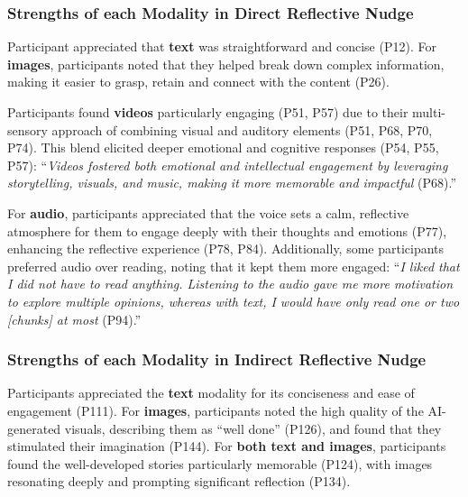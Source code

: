 \subsubsection{Strengths of each Modality in Direct Reflective Nudge}
Participant appreciated that \textbf{text} was straightforward and concise (P12). For \textbf{images}, participants noted that they helped break down complex information, making it easier to grasp, retain and connect with the content (P26).

Participants found \textbf{videos} particularly engaging (P51, P57) due to their multi-sensory approach of combining visual and auditory elements (P51, P68, P70, P74). This blend elicited deeper emotional and cognitive responses (P54, P55, P57): ``\textit{Videos fostered both emotional and intellectual engagement by leveraging storytelling, visuals, and music, making it more memorable and impactful} (P68).''

For \textbf{audio}, participants appreciated that the voice sets a calm, reflective atmosphere for them to engage deeply with their thoughts and emotions (P77), enhancing the reflective experience (P78, P84).
Additionally, some participants preferred audio over reading, noting that it kept them more engaged: ``\textit{I liked that I did not have to read anything. Listening to the audio gave me more motivation to explore multiple opinions, whereas with text, I would have only read one or two [chunks] at most} (P94).''

\subsubsection{Strengths of each Modality in Indirect Reflective Nudge}
Participants appreciated the \textbf{text} modality for its conciseness and ease of engagement (P111). For \textbf{images}, participants noted the high quality of the AI-generated visuals, describing them as ``well done'' (P126), and found that they stimulated their imagination (P144). For \textbf{both text and images}, participants found the well-developed stories particularly memorable (P124), with images resonating deeply and prompting significant reflection (P134). 

